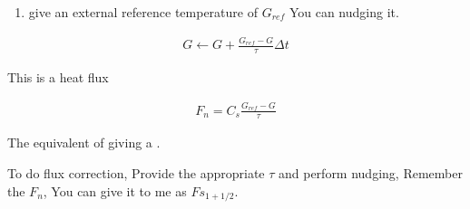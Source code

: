 \begin{enumerate}
\def\labelenumi{\arabic{enumi}.}
\setcounter{enumi}{4}
\tightlist
\item
  give an external reference temperature of \(G_{ref}\) You can nudging
  it.
\end{enumerate}

\begin{eqnarray}
        G \leftarrow G + \frac{G_{ref} - G}{\tau} \Delta t
\end{eqnarray}

This is a heat flux

\begin{eqnarray}
        F_n = C_s \frac{G_{ref} - G}{\tau}
\end{eqnarray}

The equivalent of giving a .

To do flux correction, Provide the appropriate \(\tau\) and perform
nudging, Remember the \(F_n\), You can give it to me as \(Fs_{1+1/2}\).
